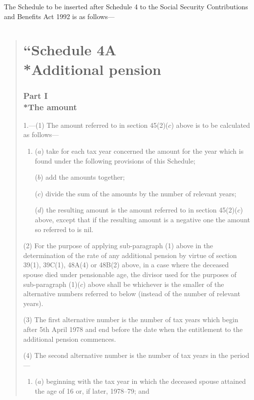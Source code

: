 \documentclass[12pt,a4paper]{article}
\begin{document}
\renewcommand\parthead{--- Schedule 4}


\noindent
The Schedule to be inserted after Schedule 4 to the Social Security Contributions and Benefits Act 1992 is as follows—
\begin{quotation}
\part*{\noindent “Schedule 4A\\*Additional pension}

\section*{Part I\\*The amount}

1.---(1) The amount referred to in section 45(2)($c$)  above is to be calculated as follows—
\begin{enumerate}\item[]
($a$) take for each tax year concerned the amount for the year which is found under the following provisions of this Schedule;

($b$) add the amounts together;

($c$) divide the sum of the amounts by the number of relevant years;

($d$) the resulting amount is the amount referred to in section 45(2)($c$)  above, except that if the resulting amount is a negative one the amount so referred to is nil.
\end{enumerate}

(2) For the purpose of applying sub-paragraph (1)  above in the determination of the rate of any additional pension by virtue of section 39(1), 39C(1), 48A(4)  or 48B(2)  above, in a case where the deceased spouse died under pensionable age, the divisor used for the purposes of sub-paragraph (1)($c$)  above shall be whichever is the smaller of the alternative numbers referred to below (instead of the number of relevant years).

(3) The first alternative number is the number of tax years which begin after 5th April 1978 and end before the date when the entitlement to the additional pension commences.

(4) The second alternative number is the number of tax years in the period—
\begin{enumerate}\item[]
($a$) beginning with the tax year in which the deceased spouse attained the age of 16 or, if later, 1978--79; and


\end{enumerate}
\end{quotation}
\end{document}

